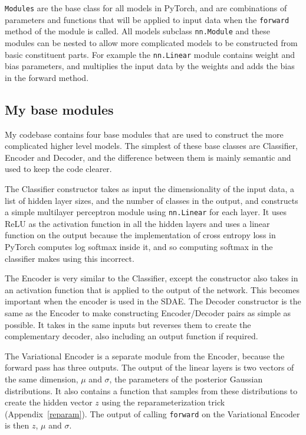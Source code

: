 \texttt{Modules} are the base class for all models in PyTorch, and are combinations of parameters and functions that will be applied to input 
data when the \texttt{forward} method of the module is called. All models subclass \texttt{nn.Module} and these modules can be nested
to allow more complicated models to be constructed from basic constituent parts. For example the \texttt{nn.Linear} module contains 
weight and bias parameters, and multiplies the input data by the weights and adds the bias in the forward method.

\subsection{My base modules}
My codebase contains four base modules that are used to construct the more complicated higher level models. The simplest of 
these base classes are Classifier, Encoder and Decoder, and the difference between them is mainly semantic and used to keep the
code clearer.

The Classifier constructor takes as input the dimensionality of the input data, a list of hidden layer sizes, and the number of classes 
in the output, and constructs a simple multilayer perceptron module using \texttt{nn.Linear} for each layer. It uses ReLU as the activation 
function in all the hidden layers and uses a linear function on the output because the implementation of 
cross entropy loss in PyTorch computes log softmax inside it, and so computing softmax in the classifier makes using this incorrect.

The Encoder is very similar to the Classifier, except the constructor also takes in an activation function that is applied to the output 
of the network. This becomes important when the encoder is used in the SDAE. The Decoder constructor is the same as the Encoder to make 
constructing Encoder/Decoder pairs as simple as possible. It takes in the same inputs but reverses them to create the complementary decoder,
also including an output function if required.

The Variational Encoder is a separate module from the Encoder, because the forward pass has three outputs. 
The output of the linear layers is two vectors of the same dimension, $\mu$ and $\sigma$, the parameters of the posterior Gaussian distributions.
It also contains a function that samples from these distributions to create the hidden vector $z$ using the reparameterization trick 
(Appendix~\ref{reparam}). The output of calling \texttt{forward} on the Variational Encoder is then $z$, $\mu$ and $\sigma$.

